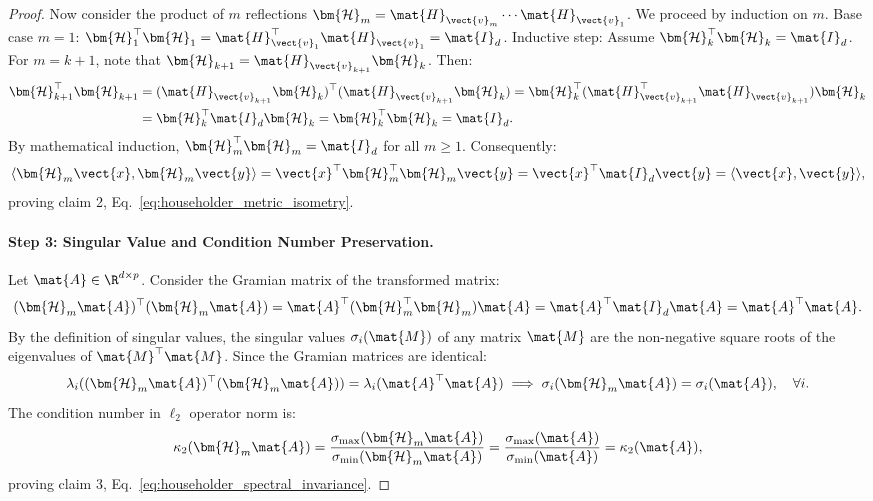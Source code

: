 \begin{proof}
Now consider the product of $m$ reflections $\bm{\mathcal{H}}_m = \mat{H}_{\vect{v}_m} \cdots \mat{H}_{\vect{v}_1}$.
We proceed by induction on $m$.
Base case $m=1$: $\bm{\mathcal{H}}_1^\top \bm{\mathcal{H}}_1 = \mat{H}_{\vect{v}_1}^\top \mat{H}_{\vect{v}_1} = \mat{I}_d$.
Inductive step: Assume $\bm{\mathcal{H}}_k^\top \bm{\mathcal{H}}_k = \mat{I}_d$.
For $m = k + 1$, note that $\bm{\mathcal{H}}_{k+1} = \mat{H}_{\vect{v}_{k+1}} \bm{\mathcal{H}}_k$. Then:
\begin{align}
\bm{\mathcal{H}}_{k+1}^\top \bm{\mathcal{H}}_{k+1} &= (\mat{H}_{\vect{v}_{k+1}} \bm{\mathcal{H}}_k)^\top (\mat{H}_{\vect{v}_{k+1}} \bm{\mathcal{H}}_k) = \bm{\mathcal{H}}_k^\top (\mat{H}_{\vect{v}_{k+1}}^\top \mat{H}_{\vect{v}_{k+1}}) \bm{\mathcal{H}}_k \nonumber \\
&= \bm{\mathcal{H}}_k^\top \mat{I}_d \bm{\mathcal{H}}_k = \bm{\mathcal{H}}_k^\top \bm{\mathcal{H}}_k = \mat{I}_d.
\end{align}
By mathematical induction, $\bm{\mathcal{H}}_m^\top \bm{\mathcal{H}}_m = \mat{I}_d$ for all $m \ge 1$.
Consequently:
\begin{equation}
\langle \bm{\mathcal{H}}_m \vect{x}, \bm{\mathcal{H}}_m \vect{y} \rangle = \vect{x}^\top \bm{\mathcal{H}}_m^\top \bm{\mathcal{H}}_m \vect{y} = \vect{x}^\top \mat{I}_d \vect{y} = \langle \vect{x}, \vect{y} \rangle,
\end{equation}
proving claim 2, Eq.~\eqref{eq:householder_metric_isometry}.

\paragraph{Step 3: Singular Value and Condition Number Preservation.}
Let $\mat{A} \in \R^{d \times p}$.
Consider the Gramian matrix of the transformed matrix:
\begin{equation}
(\bm{\mathcal{H}}_m \mat{A})^\top (\bm{\mathcal{H}}_m \mat{A}) = \mat{A}^\top (\bm{\mathcal{H}}_m^\top \bm{\mathcal{H}}_m) \mat{A} = \mat{A}^\top \mat{I}_d \mat{A} = \mat{A}^\top \mat{A}.
\end{equation}
By the definition of singular values, the singular values $\sigma_i(\mat{M})$ of any matrix $\mat{M}$ are the non-negative square roots of the eigenvalues of $\mat{M}^\top \mat{M}$.
Since the Gramian matrices are identical:
\begin{equation}
\lambda_i((\bm{\mathcal{H}}_m \mat{A})^\top (\bm{\mathcal{H}}_m \mat{A})) = \lambda_i(\mat{A}^\top \mat{A}) \implies \sigma_i(\bm{\mathcal{H}}_m \mat{A}) = \sigma_i(\mat{A}), \quad \forall i.
\end{equation}
The condition number in $\ell_2$ operator norm is:
\begin{equation}
\kappa_2(\bm{\mathcal{H}}_m \mat{A}) = \frac{\sigma_{\max}(\bm{\mathcal{H}}_m \mat{A})}{\sigma_{\min}(\bm{\mathcal{H}}_m \mat{A})} = \frac{\sigma_{\max}(\mat{A})}{\sigma_{\min}(\mat{A})} = \kappa_2(\mat{A}),
\end{equation}
proving claim 3, Eq.~\eqref{eq:householder_spectral_invariance}.


\end{proof}
